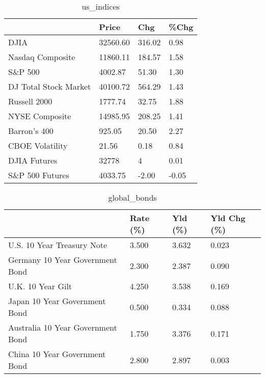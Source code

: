 \documentclass{article}%
\begin{document}
%


\begin{table}[htbp]%
\caption{us\_indices}%
\centering%
\begin{adjustbox}{width=1\textwidth}%
\begin{tabular}{llll}
\toprule
                      &    Price &    Chg &  \%Chg \\
\midrule
                 DJIA & 32560.60 & 316.02 &  0.98 \\
     Nasdaq Composite & 11860.11 & 184.57 &  1.58 \\
              S\&P 500 &  4002.87 &  51.30 &  1.30 \\
DJ Total Stock Market & 40100.72 & 564.29 &  1.43 \\
         Russell 2000 &  1777.74 &  32.75 &  1.88 \\
       NYSE Composite & 14985.95 & 208.25 &  1.41 \\
         Barron's 400 &   925.05 &  20.50 &  2.27 \\
      CBOE Volatility &    21.56 &   0.18 &  0.84 \\
         DJIA Futures &    32778 &      4 &  0.01 \\
      S\&P 500 Futures &  4033.75 &  -2.00 & -0.05 \\
\bottomrule
\end{tabular}
%
\end{adjustbox}%
\end{table}

%


\begin{table}[htbp]%
\caption{global\_bonds}%
\centering%
\begin{adjustbox}{width=1\textwidth}%
\begin{tabular}{llll}
\toprule
                                  & Rate (\%) & Yld (\%) & Yld Chg (\%) \\
\midrule
       U.S. 10 Year Treasury Note &    3.500 &   3.632 &       0.023 \\
  Germany 10 Year Government Bond &    2.300 &   2.387 &       0.090 \\
                U.K. 10 Year Gilt &    4.250 &   3.538 &       0.169 \\
    Japan 10 Year Government Bond &    0.500 &   0.334 &       0.088 \\
Australia 10 Year Government Bond &    1.750 &   3.376 &       0.171 \\
    China 10 Year Government Bond &    2.800 &   2.897 &       0.003 \\
\bottomrule
\end{tabular}
%
\end{adjustbox}%
\end{table}
\end{document}
